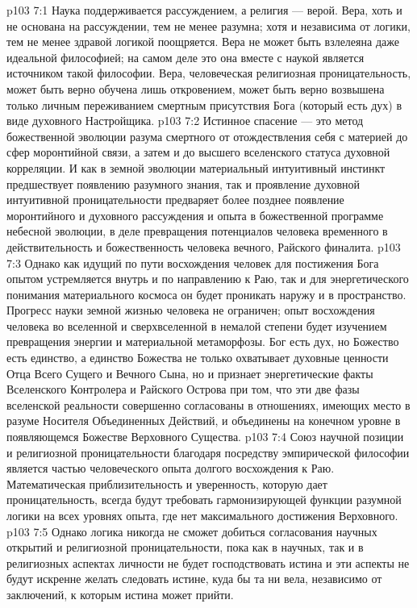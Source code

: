 \vs p103 7:1 Наука поддерживается рассуждением, а религия --- верой. Вера, хоть и не основана на рассуждении, тем не менее разумна; хотя и независима от логики, тем не менее здравой логикой поощряется. Вера не может быть взлелеяна даже идеальной философией; на самом деле это она вместе с наукой является источником такой философии. Вера, человеческая религиозная проницательность, может быть верно обучена лишь откровением, может быть верно возвышена только личным переживанием смертным присутствия Бога (который есть дух) в виде духовного Настройщика.
\vs p103 7:2 \pc Истинное спасение --- это метод божественной эволюции разума смертного от отождествления себя с материей до сфер моронтийной связи, а затем и до высшего вселенского статуса духовной корреляции. И как в земной эволюции материальный интуитивный инстинкт предшествует появлению разумного знания, так и проявление духовной интуитивной проницательности предваряет более позднее появление моронтийного и духовного рассуждения и опыта в божественной программе небесной эволюции, в деле превращения потенциалов человека временного в действительность и божественность человека вечного, Райского финалита.
\vs p103 7:3 Однако как идущий по пути восхождения человек для постижения Бога опытом устремляется внутрь и по направлению к Раю, так и для энергетического понимания материального космоса он будет проникать наружу и в пространство. Прогресс науки земной жизнью человека не ограничен; опыт восхождения человека во вселенной и сверхвселенной в немалой степени будет изучением превращения энергии и материальной метаморфозы. Бог есть дух, но Божество есть единство, а единство Божества не только охватывает духовные ценности Отца Всего Сущего и Вечного Сына, но и признает энергетические факты Вселенского Контролера и Райского Острова при том, что эти две фазы вселенской реальности совершенно согласованы в отношениях, имеющих место в разуме Носителя Объединенных Действий, и объединены на конечном уровне в появляющемся Божестве Верховного Существа.
\vs p103 7:4 \pc Союз научной позиции и религиозной проницательности благодаря посредству эмпирической философии является частью человеческого опыта долгого восхождения к Раю. Математическая приблизительность и уверенность, которую дает проницательность, всегда будут требовать гармонизирующей функции разумной логики на всех уровнях опыта, где нет максимального достижения Верховного.
\vs p103 7:5 Однако логика никогда не сможет добиться согласования научных открытий и религиозной проницательности, пока как в научных, так и в религиозных аспектах личности не будет господствовать истина и эти аспекты не будут искренне желать следовать истине, куда бы та ни вела, независимо от заключений, к которым истина может прийти.
